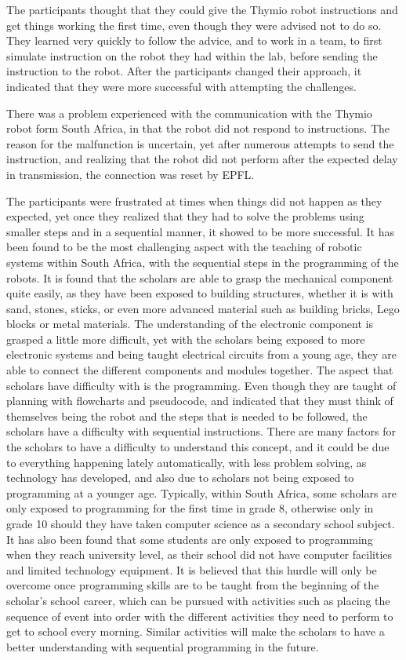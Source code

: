 \documentclass{intech-journal}
\begin{document}
The participants thought that they could give the Thymio robot instructions and get things working the first time, even though they were advised not to do so. They learned very quickly to follow the advice, and to work in a team, to first simulate instruction on the robot they had within the lab, before sending the instruction to the robot. After the participants changed their approach, it indicated that they were more successful with attempting the challenges. 

There was a problem experienced with the communication with the Thymio robot form South Africa, in that the robot did not respond to instructions. The reason for the malfunction is uncertain, yet after numerous attempts to send the instruction, and realizing that the robot did not perform after the expected delay in transmission, the connection was reset by EPFL.

The participants were frustrated at times when things did not happen as they expected, yet once they realized that they had to solve the problems using smaller steps and in a sequential manner, it showed to be more successful. It has been found to be the most challenging aspect with the teaching of robotic systems within South Africa, with the sequential steps in the programming of the robots. It is found that the scholars are able to grasp the mechanical component quite easily, as they have been exposed to building structures, whether it is with sand, stones, sticks, or even more advanced material such as building bricks, Lego blocks or metal materials. The understanding of the electronic component is grasped a little more difficult, yet with the scholars being exposed to more electronic systems and being taught electrical circuits from a young age, they are able to connect the different components and modules together. The aspect that scholars have difficulty with is the programming. Even though they are taught of planning with flowcharts and pseudocode, and indicated that they must think of themselves being the robot and the steps that is needed to be followed, the scholars have a difficulty with sequential instructions. There are many factors for the scholars to have a difficulty to understand this concept, and it could be due to everything happening lately automatically, with less problem solving, as technology has developed, and also due to scholars not being exposed to programming at a younger age. Typically, within South Africa, some scholars are only exposed to programming for the first time in grade 8, otherwise only in grade 10 should they have taken computer science as a secondary school subject. It has also been found that some students are only exposed to programming when they reach university level, as their school did not have computer facilities and limited technology equipment. It is believed that this hurdle will only be overcome once programming skills are to be taught from the beginning of the scholar’s school career, which can be pursued with activities such as placing the sequence of event into order with the different activities they need to perform to get to school every morning. Similar activities will make the scholars to have a better understanding with sequential programming in the future.
\end{document}
